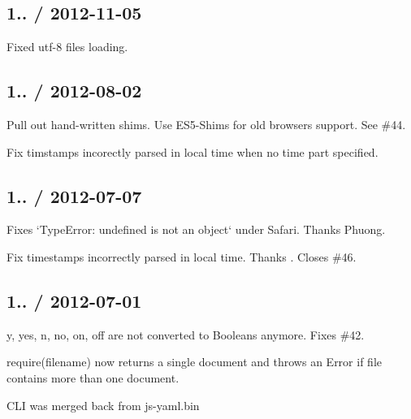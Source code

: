 \subsection*{1.. / 2012-\/11-\/05 }


\begin{DoxyItemize}
\item Fixed utf-\/8 files loading.
\end{DoxyItemize}

\subsection*{1.. / 2012-\/08-\/02 }


\begin{DoxyItemize}
\item Pull out hand-\/written shims. Use E\+S5-\/\+Shims for old browsers support. See \#44.
\item Fix timstamps incorectly parsed in local time when no time part specified.
\end{DoxyItemize}

\subsection*{1.. / 2012-\/07-\/07 }


\begin{DoxyItemize}
\item Fixes `\+Type\+Error\+: \textquotesingle{}undefined\textquotesingle{} is not an object` under Safari. Thanks Phuong.
\item Fix timestamps incorrectly parsed in local time. Thanks . Closes \#46.
\end{DoxyItemize}

\subsection*{1.. / 2012-\/07-\/01 }


\begin{DoxyItemize}
\item {\ttfamily y}, {\ttfamily yes}, {\ttfamily n}, {\ttfamily no}, {\ttfamily on}, {\ttfamily off} are not converted to Booleans anymore. Fixes \#42.
\item {\ttfamily require(filename)} now returns a single document and throws an Error if file contains more than one document.
\item C\+L\+I was merged back from js-\/yaml.\+bin
\end{DoxyItemize}

